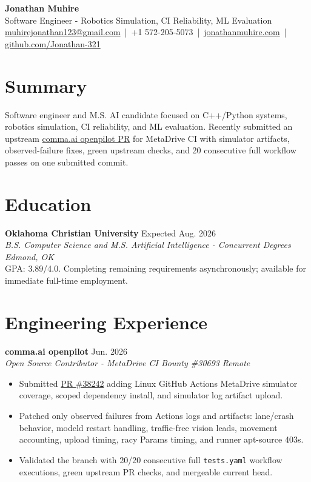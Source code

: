 \documentclass[9pt,letterpaper]{article}
\newcommand{\resumeRole}[4]{
  \textbf{#1} \hfill #2\\
  \textit{#3} \hfill \textit{#4}
}
\begin{document}
\begin{center}
  {\Large \textbf{Jonathan Muhire}}\\
  Software Engineer - Robotics Simulation, CI Reliability, ML Evaluation\\
  \href{mailto:muhirejonathan123@gmail.com}{muhirejonathan123@gmail.com} \,|\, 
  +1 572-205-5073 \,|\, 
  \href{https://jonathanmuhire.com}{jonathanmuhire.com} \,|\, 
  \href{https://github.com/Jonathan-321}{github.com/Jonathan-321}
\end{center}

\section{Summary}
Software engineer and M.S. AI candidate focused on C++/Python systems, robotics simulation, CI reliability, and ML evaluation. Recently submitted an upstream \href{https://github.com/commaai/openpilot/pull/38242}{comma.ai openpilot PR} for MetaDrive CI with simulator artifacts, observed-failure fixes, green upstream checks, and 20 consecutive full workflow passes on one submitted commit.

\section{Education}
\resumeRole{Oklahoma Christian University}{Expected Aug. 2026}{B.S. Computer Science and M.S. Artificial Intelligence - Concurrent Degrees}{Edmond, OK}\\
GPA: 3.89/4.0. Completing remaining requirements asynchronously; available for immediate full-time employment.

\section{Engineering Experience}
\resumeRole{comma.ai openpilot}{Jun. 2026}{Open Source Contributor - MetaDrive CI Bounty \#30693}{Remote}
\begin{itemize}
  \item Submitted \href{https://github.com/commaai/openpilot/pull/38242}{PR \#38242} adding Linux GitHub Actions MetaDrive simulator coverage, scoped dependency install, and simulator log artifact upload.
  \item Patched only observed failures from Actions logs and artifacts: lane/crash behavior, modeld restart handling, traffic-free vision leads, movement accounting, upload timing, racy Params timing, and runner apt-source 403s.
  \item Validated the branch with 20/20 consecutive full \texttt{tests.yaml} workflow executions, green upstream PR checks, and mergeable current head.
\end{itemize}
\end{document}
